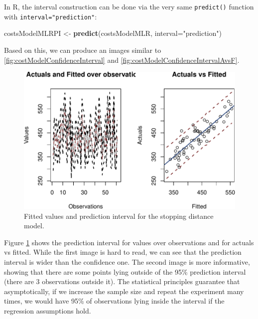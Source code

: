 \documentclass[
]{book}
\newenvironment{Shaded}{\begin{snugshade}}{\end{snugshade}}
\newcommand{\AttributeTok}[1]{\textcolor[rgb]{0.13,0.29,0.53}{#1}}
\newcommand{\FunctionTok}[1]{\textcolor[rgb]{0.13,0.29,0.53}{\textbf{#1}}}
\newcommand{\NormalTok}[1]{#1}
\newcommand{\OtherTok}[1]{\textcolor[rgb]{0.56,0.35,0.01}{#1}}
\newcommand{\StringTok}[1]{\textcolor[rgb]{0.31,0.60,0.02}{#1}}
\theoremstyle{definition}
\theoremstyle{definition}
\theoremstyle{definition}
\theoremstyle{definition}
\theoremstyle{remark}
\begin{document}
In R, the interval construction can be done via the very same \texttt{predict()} function with \texttt{interval="prediction"}:

\begin{Shaded}
\begin{Highlighting}[]
\NormalTok{costsModelMLRPI }\OtherTok{\textless{}{-}} \FunctionTok{predict}\NormalTok{(costsModelMLR, }\AttributeTok{interval=}\StringTok{"prediction"}\NormalTok{)}
\end{Highlighting}
\end{Shaded}

Based on this, we can produce an images similar to \ref{fig:costModelConfidenceInterval} and \ref{fig:costModelConfidenceIntervalAvsF}.

\begin{figure}
\centering
\includegraphics{Svetunkov---Statistics-for-Business-Analytics_files/figure-latex/costModelPI-1.pdf}
\caption{\label{fig:costModelPI}Fitted values and prediction interval for the stopping distance model.}
\end{figure}

Figure \ref{fig:costModelPI} shows the prediction interval for values over observations and for actuals vs fitted. While the first image is hard to read, we can see that the prediction interval is wider than the confidence one. The second image is more informative, showing that there are some points lying outside of the 95\% prediction interval (there are 3 observations outside it). The statistical principles guarantee that asymptotically, if we increase the sample size and repeat the experiment many times, we would have 95\% of observations lying inside the interval if the regression assumptions hold.
\end{document}
